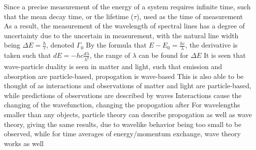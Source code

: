 \documentclass[11 pt, twoside]{article}
\newenvironment{outline*}
{
	\begin{outline}[enumerate]
	}
	{\end{outline}
}
\begin{document}
\begin{outline*}
	\2 Since a precise measurement of the energy of a system requires infinite time, such that the mean decay time, or the lifetime ($\tau$), used as the time of measurement
		\3 As a result, the measurement of the wavelength of spectral lines has a degree of uncertainty due to the uncertain in measurement, with the natural line width being $\Delta E = \frac{\hbar}{\tau}$, denoted $\Gamma_0$
		\3 By the formula that $E - E_0 = \frac{hc}{\lambda}$, the derivative is taken such that $dE = -hc\frac{d\lambda}{\lambda^2}$, the range of $\lambda$ can be found for $\Delta E$
\1 It is seen that wave-particle duality is seen in matter and light, such that emission and absorption are particle-based, propogation is wave-based
	\2 This is also able to be thought of as interactions and observations of matter and light are particle-based, while predictions of observations are described by waves
		\3 Interactions cause the changing of the wavefunction, changing the propogation after
	\2 For wavelengths smaller than any objects, particle theory can describe propogation as well as wave theory, giving the same results, due to wavelike behavior being too small to be observed, while for time averages of energy/momentum exchange, wave theory works as well
\end{outline*}
\end{document}
